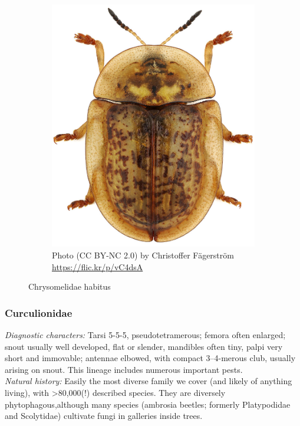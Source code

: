 \documentclass[letterpaper, 11pt]{article}
\begin{document}
\begin{figure}[ht!]
\begin{subfigure}[ht!]{0.23\textwidth}
    \includegraphics[width=\textwidth]{Chrysomelid3}
  \caption{Photo (CC BY-NC 2.0) by Christoffer F\"{a}gerstr\"{o}m  \url{https://flic.kr/p/vC4dsA}}
  \label{fig:chrysomelid3}
\end{subfigure}
    \caption{Chrysomelidae habitus}\label{fig:chrysomelids}
\end{figure}

\subsubsection{Curculionidae}
\noindent{}\textit{Diagnostic characters:} Tarsi 5-5-5, pseudotetramerous; femora often enlarged; snout usually well developed, flat or slender, mandibles often tiny, palpi very short and immovable; antennae elbowed, with compact 3--4-merous club, usually arising on snout. This lineage includes numerous important pests.\\

\noindent{}\textit{Natural history:} Easily the most diverse family we cover (and likely of anything living), with \textgreater80,000(!) described species. They are diversely phytophagous,although many species (ambrosia beetles; formerly Platypodidae and Scolytidae) cultivate fungi in galleries inside trees. \\
\end{document}
